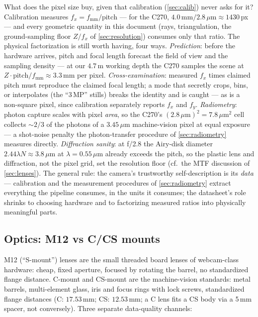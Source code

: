 \documentclass[11pt]{article}
\theoremstyle{definition}
\begin{document}
What does the pixel size buy, given that calibration
(\autoref{sec:calib}) never asks for it? Calibration measures
$f_x = f_{\text{mm}}/\text{pitch}$ --- for the C270,
$4.0\,\text{mm}/2.8\,\mu\text{m} \approx 1430$\,px --- and every
geometric quantity in this document (rays, triangulation, the
ground-sampling floor $Z/f_x$ of \autoref{sec:resolution}) consumes
only that ratio. The physical factorization is still worth having,
four ways. \emph{Prediction}: before the hardware arrives, pitch and
focal length forecast the field of view and the sampling density ---
at our $4.7$\,m working depth the C270 samples the scene at
$Z\cdot\text{pitch}/f_{\text{mm}}\approx3.3$\,mm per pixel.
\emph{Cross-examination}: measured $f_x$ times claimed pitch must
reproduce the claimed focal length; a mode that secretly crops, bins,
or interpolates (the ``3\,MP'' stills) breaks the identity and is
caught --- as is a non-square pixel, since calibration separately
reports $f_x$ and $f_y$. \emph{Radiometry}: photon capture scales with
pixel \emph{area}, so the C270's $(2.8\,\mu\text{m})^2=7.8\,\mu\text{m}^2$
cell collects $\sim$$2/3$ of the photons of a
$3.45\,\mu$m machine-vision pixel at equal exposure --- a shot-noise
penalty the photon-transfer procedure of \autoref{sec:radiometry}
measures directly. \emph{Diffraction sanity}: at f/2.8 the Airy-disk
diameter $2.44\lambda N\approx3.8\,\mu$m at $\lambda=0.55\,\mu$m
already exceeds the pitch, so the plastic lens and diffraction, not
the pixel grid, set the resolution floor (cf.\ the MTF discussion of
\autoref{sec:lenses}). The general rule: the camera's trustworthy
self-description is its \emph{data} --- calibration and the
measurement procedures of \autoref{sec:radiometry} extract everything
the pipeline consumes, in the units it consumes; the datasheet's role
shrinks to choosing hardware and to factorizing measured ratios into
physically meaningful parts.

\subsection{Optics: M12 vs C/CS mounts}
\label{sec:lenses}

M12 (``S-mount'') lenses are the small threaded board lenses of
webcam-class hardware: cheap, fixed aperture, focused by rotating the
barrel, no standardized flange distance. C-mount and CS-mount are the
machine-vision standards: metal barrels, multi-element glass, iris and
focus rings with lock screws, standardized flange distances (C:
$17.53$\,mm; CS: $12.53$\,mm; a C lens fits a CS body via a 5\,mm spacer,
not conversely). Three separate data-quality channels:
\end{document}
